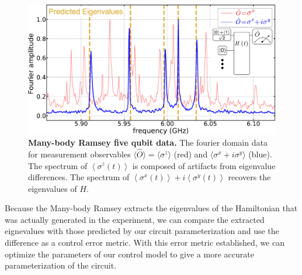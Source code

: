 \begin{figure}[h]
    \begin{center}
        \includegraphics[width=150 mm]{./PDF/mbr_peaks_5q_data_191016_1057a.pdf}
    \end{center}
    \caption{\textbf{Many-body Ramsey five qubit data.}
    The fourier domain data for measurement observables
    $\langle \hat{O} \rangle =\langle \sigma^z \rangle$ (red) and $\langle \sigma^x + i \sigma^y \rangle$ (blue).
    The spectrum of $\left< \sigma^z (t) \right>$ is composed of artifacts from eigenvalue differences.
    The spectrum of $\left< \sigma^x (t) \right> + i \left< \sigma^y (t) \right>$ recovers the eigenvalues of $H$.
    }
    \label{mbr_peaks_data}
\end{figure}
Because the Many-body Ramsey extracts the eigenvalues of the Hamiltonian that was actually generated in the experiment,
we can compare the extracted eignevalues with those predicted by our circuit parameterization and use the difference as a control error metric.
With this error metric established, we can optimize the parameters of our control model to give a more accurate parameterization of the circuit.

